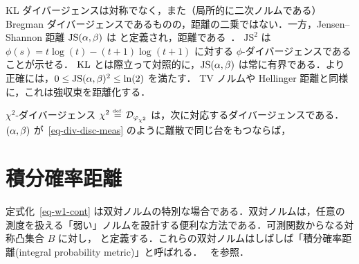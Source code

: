 \begin{example}
	KL ダイバージェンスは対称でなく，また（局所的に二次ノルムである）Bregman ダイバージェンスであるものの，距離の二乗ではない．一方，Jensen--Shannon 距離 $\text{JS}(\alpha,\beta)$ は
	と定義され，距離である~\citep{endres2003new,osterreicher2003new}．
	$\text{JS}^2$ は $\phi(s) = t\log(t)-(t+1)\log(t+1)$ に対する $\phi$-ダイバージェンスであることが示せる．
	$\operatorname{KL}$ とは際立って対照的に，$\text{JS}(\alpha,\beta)$ は常に有界である．より正確には，$0 \leq \text{JS}(\alpha,\beta)^2 \leq \ln(2)$ を満たす．
	TV ノルムや Hellinger 距離と同様に，これは強収束を距離化する．
\end{example}



\begin{example}[$\chi^2$]\label{exmp-chisquare}
	$\chi^2$-ダイバージェンス $\chi^2 \stackrel{\mbox{\upshape\tiny def.}}{=} \mathcal{D}_{\varphi_{\chi^2}}$ は，次に対応するダイバージェンスである．
	$(\alpha,\beta)$ が~\eqref{eq-div-disc-meas} のように離散で同じ台をもつならば，
\end{example}


\section{積分確率距離}
\label{sec-dual-norms}


定式化~\eqref{eq-w1-cont} は双対ノルムの特別な場合である．双対ノルムは，任意の測度を扱える「弱い」ノルムを設計する便利な方法である．可測関数からなる対称凸集合 $B$ に対し，
と定義する．これらの双対ノルムはしばしば「積分確率距離(integral probability metric)」と呼ばれる．~\citep{sriperumbudur2012empirical} を参照．


